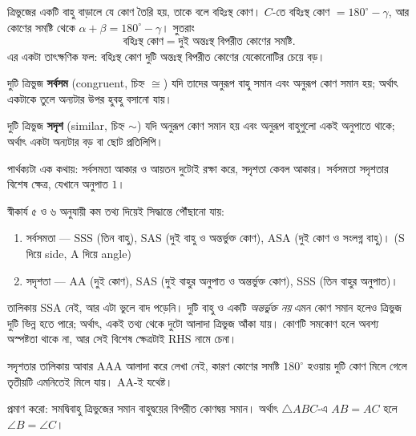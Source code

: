 \documentclass[11pt]{article}
\begin{document}
\begin{idea}[বহিঃস্থ কোণ]
ত্রিভুজের একটি বাহু বাড়ালে যে কোণ তৈরি হয়, তাকে বলে বহিঃস্থ কোণ। $C$-তে বহিঃস্থ
কোণ $= 180^\circ - \gamma$, আর কোণের সমষ্টি থেকে $\alpha + \beta = 180^\circ -
\gamma$। সুতরাং
\[
  \text{বহিঃস্থ কোণ} = \text{দুই অন্তঃস্থ বিপরীত কোণের সমষ্টি}.
\]
এর একটা তাৎক্ষণিক ফল: বহিঃস্থ কোণ দুটি অন্তঃস্থ বিপরীত কোণের যেকোনোটির চেয়ে বড়।
\end{idea}

\begin{idea}[সর্বসমতা বনাম সদৃশতা]
দুটি ত্রিভুজ \textbf{সর্বসম} (congruent, চিহ্ন $\cong$) যদি তাদের অনুরূপ বাহু
সমান এবং অনুরূপ কোণ সমান হয়; অর্থাৎ একটাকে তুলে অন্যটার উপর হুবহু বসানো যায়।

দুটি ত্রিভুজ \textbf{সদৃশ} (similar, চিহ্ন $\sim$) যদি অনুরূপ কোণ সমান হয় এবং
অনুরূপ বাহুগুলো একই অনুপাতে থাকে; অর্থাৎ একটা অন্যটার বড় বা ছোট প্রতিলিপি।

পার্থক্যটা এক কথায়: সর্বসমতা আকার ও আয়তন দুটোই রক্ষা করে, সদৃশতা কেবল আকার।
সর্বসমতা সদৃশতার বিশেষ ক্ষেত্র, যেখানে অনুপাত $1$।

স্বীকার্য ৫ ও ৬ অনুযায়ী কম তথ্য দিয়েই সিদ্ধান্তে পৌঁছানো যায়:
\begin{enumerate}
  \item সর্বসমতা --- SSS (তিন বাহু), SAS (দুই বাহু ও অন্তর্ভুক্ত কোণ),
        ASA (দুই কোণ ও সংলগ্ন বাহু)। (S দিয়ে side, A দিয়ে angle)
  \item সদৃশতা --- AA (দুই কোণ), SAS (দুই বাহুর অনুপাত ও অন্তর্ভুক্ত কোণ),
        SSS (তিন বাহুর অনুপাত)।
\end{enumerate}
\end{idea}

\begin{remark}
তালিকায় SSA নেই, আর এটা ভুলে বাদ পড়েনি। দুটি বাহু ও একটি \emph{অন্তর্ভুক্ত নয়}
এমন কোণ সমান হলেও ত্রিভুজ দুটি ভিন্ন হতে পারে; অর্থাৎ, একই তথ্য থেকে দুটো আলাদা
ত্রিভুজ আঁকা যায়। কোণটি সমকোণ হলে অবশ্য অস্পষ্টতা থাকে না, আর সেই বিশেষ ক্ষেত্রটাই
RHS নামে চেনা।

সদৃশতার তালিকায় আবার AAA আলাদা করে লেখা নেই, কারণ কোণের সমষ্টি $180^\circ$ হওয়ায়
দুটি কোণ মিলে গেলে তৃতীয়টি এমনিতেই মিলে যায়। AA-ই যথেষ্ট।
\end{remark}

\begin{example}
প্রমাণ করো: সমদ্বিবাহু ত্রিভুজের সমান বাহুদ্বয়ের বিপরীত কোণদ্বয় সমান। অর্থাৎ
$\triangle ABC$-এ $AB = AC$ হলে $\angle B = \angle C$।
\end{example}
\end{document}
